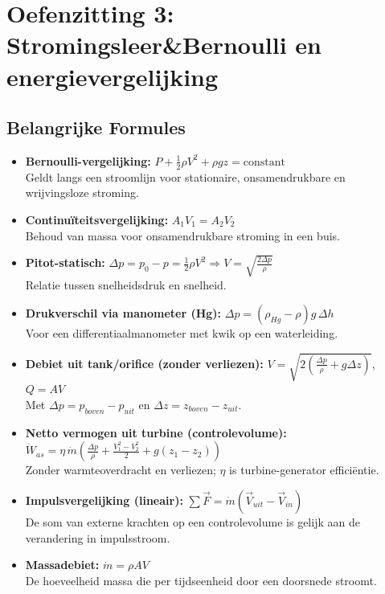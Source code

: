 \documentclass[a4paper,11pt,twoside]{report}
\newcounter{opgave}[section]
\begin{document}

\section{Oefenzitting 3: Stromingsleer\&Bernoulli en energievergelijking}
\setcounter{opgave}{0}
\subsection*{Belangrijke Formules}
\begin{itemize}
    \item \textbf{Bernoulli-vergelijking:} $P + \frac{1}{2}\rho V^2 + \rho g z = \text{constant}$ \\
    Geldt langs een stroomlijn voor stationaire, onsamendrukbare en wrijvingsloze stroming.
    \item \textbf{Continuïteitsvergelijking:} $A_1 V_1 = A_2 V_2$ \\
    Behoud van massa voor onsamendrukbare stroming in een buis.
    \item \textbf{Pitot-statisch:} $\Delta p = p_0-p = \frac{1}{2}\rho V^2 \Rightarrow V=\sqrt{\frac{2\Delta p}{\rho}}$ \\
    Relatie tussen snelheidsdruk en snelheid.
    \item \textbf{Drukverschil via manometer (Hg):} $\Delta p = (\rho_{Hg}-\rho)g\,\Delta h$ \\
    Voor een differentiaalmanometer met kwik op een waterleiding.
    \item \textbf{Debiet uit tank/orifice (zonder verliezen):} $V = \sqrt{2\left(\frac{\Delta p}{\rho}+g\Delta z\right)}$, $Q=AV$ \\
    Met $\Delta p=p_{boven}-p_{uit}$ en $\Delta z=z_{boven}-z_{uit}$.
    \item \textbf{Netto vermogen uit turbine (controlevolume):} $\dot{W}_{as} = \eta\,\dot{m}\left(\frac{\Delta p}{\rho}+\frac{V_1^2-V_2^2}{2}+g(z_1-z_2)\right)$ \\
    Zonder warmteoverdracht en verliezen; $\eta$ is turbine-generator efficiëntie.
    \item \textbf{Impulsvergelijking (lineair):} $\sum \vec{F} = \dot{m} (\vec{V}_{uit} - \vec{V}_{in})$ \\
    De som van externe krachten op een controlevolume is gelijk aan de verandering in impulsstroom.
    \item \textbf{Massadebiet:} $\dot{m} = \rho A V$ \\
    De hoeveelheid massa die per tijdseenheid door een doorsnede stroomt.
\end{itemize}
\end{document}
